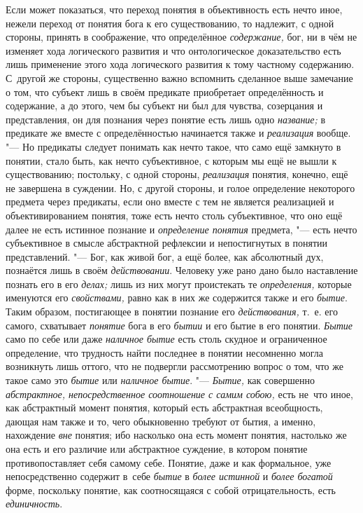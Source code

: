 Если может показаться, что переход понятия в объективность
есть нечто иное, нежели переход от понятия бога к его существованию, то
надлежит, с одной стороны, принять в соображение, что определённое
{\em содержание,} бог, ни
в чём не изменяет хода логического развития и что онтологическое
доказательство есть лишь применение этого хода логического развития к тому
частному содержанию. С~другой же стороны, существенно важно вспомнить
сделанное выше замечание о том, что субъект лишь в своём предикате
приобретает определённость и содержание, а до этого, чем бы субъект ни был
для чувства, созерцания и представления, он для познания через понятие есть
лишь одно {\em название;} в предикате же вместе с определённостью начинается
также и {\em реализация} вообще.
"--- Но предикаты следует понимать как нечто такое, что само ещё
замкнуто в понятии, стало быть, как нечто субъективное, с которым мы ещё не
вышли к существованию; постольку, с одной стороны, {\em реализация} понятия,
конечно, ещё не завершена в суждении. Но, с другой стороны, и голое
определение некоторого предмета через предикаты, если оно вместе с тем не
является реализацией и объективированием понятия, тоже есть нечто столь
субъективное, что оно ещё далее не есть истинное познание и
{\em определение понятия} предмета, "--- есть нечто субъективное в смысле
абстрактной рефлексии и непостигнутых в понятии представлений. "---
Бог, как живой бог, а ещё более, как абсолютный дух,
познаётся лишь в своём {\em действовании}.
Человеку уже рано дано было наставление познать его в его
{\em делах;} лишь из них могут проистекать те {\em определения,}
которые именуются его {\em свойствами,} равно
как в них же содержится также и его {\em бытие}. Таким
образом, постигающее в понятии познание его {\em действования,} т.~е.
его самого, схватывает {\em понятие} бога в его {\em бытии}
и его бытие в его понятии. {\em Бытие} само по себе
или даже {\em наличное бытие}
есть столь скудное и ограниченное определение, что трудность
найти последнее в понятии несомненно могла возникнуть лишь оттого, что не
подвергли рассмотрению вопрос о том, что же такое само это
{\em бытие} или {\em наличное бытие}. "--- {\em Бытие,} как
совершенно {\em абстрактное,
непосредственное соотношение с самим собою,} есть не~что иное,
как абстрактный момент понятия, который есть
абстрактная всеобщность, дающая нам также и то, чего обыкновенно требуют от
бытия, а именно, нахождение {\em вне}
понятия; ибо насколько она есть момент понятия, настолько же
она есть и его различие или абстрактное суждение, в котором понятие
противопоставляет себя самому себе. Понятие, даже и как формальное, уже
непосредственно содержит в~себе
{\em бытие} в {\em более истинной} и {\em более богатой}
форме, поскольку понятие, как соотносящаяся с собой
отрицательность, есть {\em единичность}.

